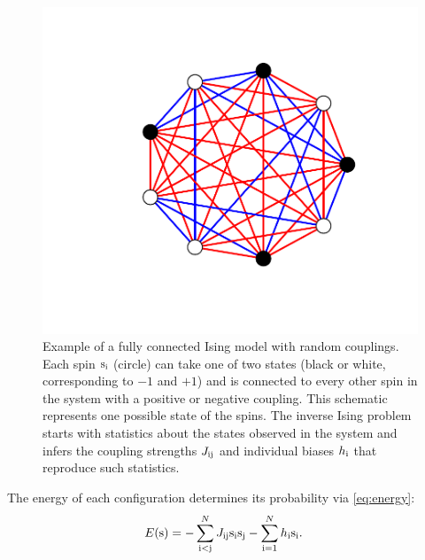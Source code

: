 \documentclass[aps,prl,twocolumn,nofootinbib]{revtex4-1}
\begin{document}
\begin{figure}[tbp]\centering
	\includegraphics[width=.85\linewidth,clip,trim={100 70 70 60}]{ising_example.pdf}
\caption{Example of a fully connected Ising model with random couplings. Each spin ${\rm s}_{\rm i}$ (circle) can take one of two states (black or white, corresponding to $-1$ and $+1$) and is connected to every other spin in the system with a positive or negative coupling.  This schematic represents one possible state of the spins.  The inverse Ising problem starts with statistics about the states observed in the system and infers the coupling strengths $J_{\rm ij}$ and individual biases $h_{\rm i}$ that reproduce such statistics. }
\label{gr:ising}
\end{figure}

The energy of each configuration determines its probability via \eqref{eq:energy}:
\begin{align}
	E({\rm s}) &= -\sum_{\rm i<j}^N J_{\rm ij}{\rm s}_{\rm i}{\rm s}_{\rm j} -\sum_{\rm i=1}^Nh_{\rm i}{\rm s}_{\rm i}.
\end{align}
\end{document}
